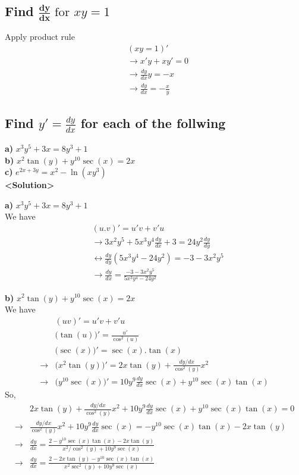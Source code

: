 \documentclass{article}
\begin{document}
\begin{multicols}{2}
\subsection{Find $\mathbf{\frac{dy}{dx}} \text{ for } xy=1$}
\noindent Apply product rule
\begin{align*}
    &(xy=1)' \\
    &\rightarrow x'y + xy' = 0 \\
    &\rightarrow \frac{dy}{dx}y = -x \\
    &\rightarrow \frac{dy}{dx}= -\frac{x}{y}
\end{align*}

\end{multicols}

\subsection{Find $y' = \frac{dy}{dx}$ for each of the follwing}
\textbf{a)} $x^3y^5 + 3x = 8y^3+1$ \\
\textbf{b)} $x^2\tan(y) + y^{10}\sec(x)=2x$ \\
\textbf{c)} $e^{2x+3y} = x^2 - \ln(xy^3)$ \\

\textbf{<Solution>} \par

\textbf{a)} $x^3y^5 + 3x = 8y^3+1$ \\
We have
\begin{align*}
    &(u.v)'=u'v+v'u \\
    &\rightarrow 3x^2y^5 + 5x^3y^4\frac{dy}{dx} + 3 = 24y^2\frac{dy}{dy} \\
    &\leftrightarrow \frac{dy}{dy}(5x^3y^4 - 24y^2) = -3 - 3x^2y^5 \\
    &\rightarrow \frac{dy}{dx} = \frac{-3 - 3x^2y^5}{5x^3y^4 - 24y^2}
\end{align*}

\textbf{b)} $x^2\tan(y) + y^{10}\sec(x)=2x$ \\
We have
\begin{align*}
    &(uv)' = u'v + v'u \\
    &\Big(\tan(u)\Big)' = \frac{u'}{\cos^2(u)} \\
    &\Big(\sec(x)\Big)' = \sec(x).\tan(x) \\
    \rightarrow &\Big(x^2\tan(y)\Big)' = 2x\tan(y) + \frac{dy/dx}{\cos^2(y)}x^2 \\
    \rightarrow &\Big(y^{10}\sec(x)\Big)' = 10y^9\frac{dy}{dx}\sec(x) + y^{10}\sec(x)\tan(x)
\end{align*}
So, 
\begin{align*}
    &2x\tan(y) + \frac{dy/dx}{\cos^2(y)}x^2 + 10y^9\frac{dy}{dx}\sec(x) + y^{10}\sec(x)\tan(x) = 0 \\
    \rightarrow &\frac{dy/dx}{\cos^2(y)}x^2 + 10y^9\frac{dy}{dx}\sec(x) = -y^{10}\sec(x)\tan(x) - 2x\tan(y) \\
    \rightarrow &\frac{dy}{dx} = \frac{2-y^{10}\sec(x)\tan(x)-2x\tan(y)}{x^2/\cos^2(y) + 10y^9\sec(x)} \\
    \rightarrow &\frac{dy}{dx} = \frac{2 - 2x\tan(y) - y^{10}\sec(x)\tan(x)}{x^2\sec^2(y) + 10y^9\sec(x)}
\end{align*}
\end{document}
